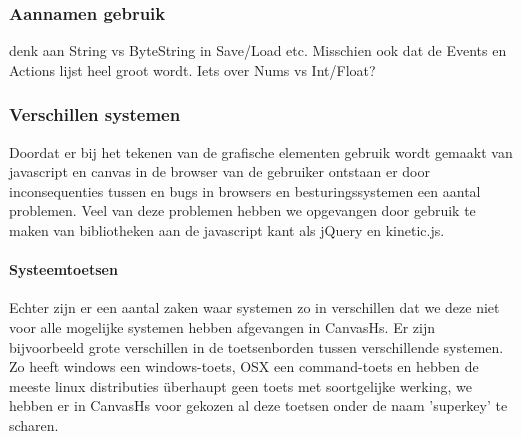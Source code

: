 \subsubsection{Aannamen gebruik}

denk aan String vs ByteString in Save/Load etc. Misschien ook dat de Events en Actions lijst heel groot wordt. Iets over Nums vs Int/Float?

\subsubsection{Verschillen systemen}
Doordat er bij het tekenen van de grafische elementen gebruik wordt gemaakt van javascript en canvas in de browser van de gebruiker ontstaan er door inconsequenties tussen en bugs in browsers en besturingssystemen een aantal problemen. Veel van deze problemen hebben we opgevangen door gebruik te maken van bibliotheken aan de javascript kant als jQuery en kinetic.js. 

\paragraph{Systeemtoetsen}Echter zijn er een aantal zaken waar systemen zo in verschillen dat we deze niet voor alle mogelijke systemen hebben afgevangen in CanvasHs. Er zijn bijvoorbeeld grote verschillen in de toetsenborden tussen verschillende systemen. Zo heeft windows een windows-toets, OSX een command-toets en hebben de meeste linux distributies überhaupt geen toets met soortgelijke werking, we hebben er in CanvasHs voor gekozen al deze toetsen onder de naam 'superkey' te scharen.
